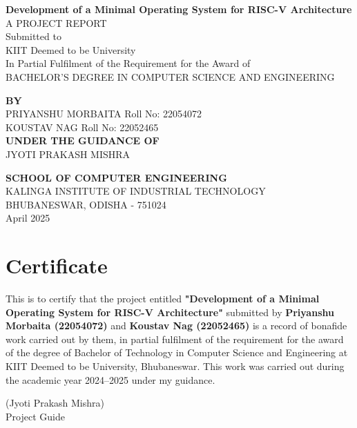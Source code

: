 \documentclass[a4paper,12pt]{report}
\begin{document}
\begin{titlepage}
    \centering
    {\Huge\bfseries Development of a Minimal Operating System for RISC-V Architecture\\[1cm]}
    {\Large A PROJECT REPORT\\[0.5cm]}
    Submitted to\\[0.2cm]
    KIIT Deemed to be University\\[0.2cm]
    In Partial Fulfilment of the Requirement for the Award of\\[0.2cm]
    BACHELOR’S DEGREE IN COMPUTER SCIENCE AND ENGINEERING\\[0.8cm]

    \begin{flushleft}
        \textbf{BY} \\[0.2cm]
        PRIYANSHU MORBAITA \hfill Roll No: 22054072 \\[0.2cm]
        KOUSTAV NAG \hfill Roll No: 22052465 \\[0.8cm]

        \textbf{UNDER THE GUIDANCE OF} \\[0.2cm]
        JYOTI PRAKASH MISHRA \\[1cm]
    \end{flushleft}

    \vfill
    \textbf{SCHOOL OF COMPUTER ENGINEERING} \\[0.2cm]
    KALINGA INSTITUTE OF INDUSTRIAL TECHNOLOGY \\[0.2cm]
    BHUBANESWAR, ODISHA - 751024 \\[0.2cm]
    April 2025
\end{titlepage}

\chapter*{Certificate}
This is to certify that the project entitled \textbf{"Development of a Minimal Operating System for RISC-V Architecture"} submitted by \textbf{Priyanshu Morbaita (22054072)} and \textbf{Koustav Nag (22052465)} is a record of bonafide work carried out by them, in partial fulfilment of the requirement for the award of the degree of Bachelor of Technology in Computer Science and Engineering at KIIT Deemed to be University, Bhubaneswar. This work was carried out during the academic year 2024--2025 under my guidance.

\vspace{2cm}
\begin{flushright}
(Jyoti Prakash Mishra) \\
Project Guide
\end{flushright}
\end{document}
